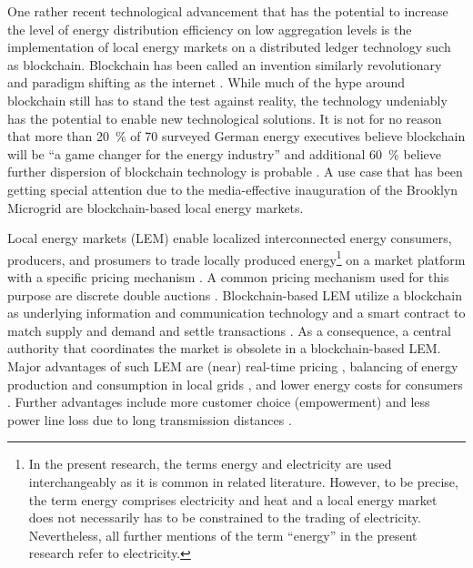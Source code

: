 One rather recent technological advancement that has the potential to increase the level of energy distribution efficiency on low aggregation levels is the implementation of local energy markets on a distributed ledger technology such as blockchain. Blockchain has been called an invention similarly revolutionary and paradigm shifting as the internet \citep{Swan:2015}. While much of the hype around blockchain still has to stand the test against reality, the technology undeniably has the potential to enable new technological solutions. It is not for no reason that more than 20~\% of 70 surveyed German energy executives believe blockchain will be “a game changer for the energy industry” and additional 60~\% believe further dispersion of blockchain technology is probable \citep{Burger:2016}. A use case that has been getting special attention due to the media-effective inauguration of the Brooklyn Microgrid \citep{newscientist:2016} are blockchain-based local energy markets.

Local energy markets (LEM) enable localized interconnected energy consumers, producers, and prosumers to trade locally produced energy\footnote{In the present research, the terms energy and electricity are used interchangeably as it is common in related literature. However, to be precise, the term energy comprises electricity and heat and a local energy market does not necessarily has to be constrained to the trading of electricity. Nevertheless, all further mentions of the term ``energy'' in the present research refer to electricity.} on a market platform with a specific pricing mechanism \citep{Mengelkamp:2018a}. A common pricing mechanism used for this purpose are discrete double auctions \citep{Lamparter:2010, Buchmann:2013, Block:2008}.  Blockchain-based LEM utilize a blockchain as underlying information and communication technology and a smart contract to match supply and demand and settle transactions \citep{Mengelkamp:2018b}. As a consequence, a central authority that coordinates the market is obsolete in a blockchain-based LEM. Major advantages of such LEM are (near) real-time pricing \citep{Mihaylov:2014}, balancing of energy production and consumption in local grids \citep{Stadler:2016}, and lower energy costs for consumers \citep{Mengelkamp:2018agentstrategies}. Further advantages include more customer choice (empowerment) \citep{Koirala:2016} and less power line loss due to long transmission distances \citep{Hvelplund:2006}.

